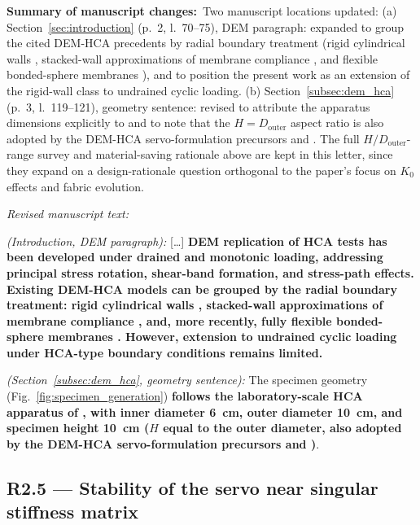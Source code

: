 \documentclass[11pt,a4paper]{article}
\newcommand{\changed}[1]{\par\noindent\textbf{Summary of manuscript changes:}\ #1\par}
\newenvironment{revtext}
  {\par\vspace{0.2em}\noindent\textit{Revised manuscript text:}\par
   \begingroup\color{black}\begin{leftbar}\small}
  {\end{leftbar}\endgroup\vspace{0.3em}}
\newcommand{\manref}[1]{(#1)}                  %
\begin{document}
\changed{Two manuscript locations updated:
(a) Section~\ref{sec:introduction} \manref{p.~2, l.~70--75}, DEM
paragraph: expanded to group the cited DEM-HCA precedents by radial
boundary treatment (rigid cylindrical walls \citep{Shi2021,Liu2021},
stacked-wall approximations of membrane compliance
\citep{LiGuoZhang2014,LiZhangGutierrez2015,LiChenGutierrez2017}, and
flexible bonded-sphere membranes
\citep{Song2024,Song2024suffusion}), and to position the present work
as an extension of the rigid-wall class to undrained cyclic loading.
(b) Section~\ref{subsec:dem_hca} \manref{p.~3, l.~119--121},
geometry sentence: revised to attribute the apparatus dimensions
explicitly to \citet{Vargas2020} and to note that the
$H = D_{\text{outer}}$ aspect ratio is also adopted by the DEM-HCA
servo-formulation precursors \citet{Han2024jgs} and \citet{Ma2024}.
The full $H/D_{\text{outer}}$-range survey and material-saving
rationale above are kept in this letter, since they expand on a
design-rationale question orthogonal to the paper's focus on $K_0$
effects and fabric evolution.}

\begin{revtext}
\textit{(Introduction, DEM paragraph):}
[\ldots] \textbf{DEM replication of HCA tests has been developed
under drained and monotonic loading, addressing principal stress
rotation, shear-band formation, and stress-path effects. Existing
DEM-HCA models can be grouped by the radial boundary treatment:
rigid cylindrical walls \citep{Shi2021,Liu2021}, stacked-wall
approximations of membrane compliance
\citep{LiGuoZhang2014,LiZhangGutierrez2015,LiChenGutierrez2017},
and, more recently, fully flexible bonded-sphere membranes
\citep{Song2024,Song2024suffusion}. However, extension to undrained
cyclic loading under HCA-type boundary conditions remains limited.}
\medskip

\textit{(Section~\ref{subsec:dem_hca}, geometry sentence):}
The specimen geometry (Fig.~\ref{fig:specimen_generation})
\textbf{follows the laboratory-scale HCA apparatus of
\citet{Vargas2020}, with inner diameter \SI{6}{cm}, outer diameter
\SI{10}{cm}, and specimen height \SI{10}{cm} ($H$ equal to the
outer diameter, also adopted by the DEM-HCA servo-formulation
precursors \citet{Han2024jgs} and \citet{Ma2024})}.
\end{revtext}

\subsection*{R2.5 --- Stability of the servo near singular stiffness matrix}
\end{document}
